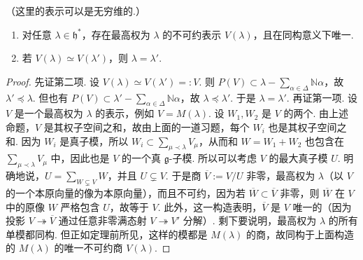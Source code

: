 \begin{theorem}\label{thm:ssl-4-1-6}
（这里的表示可以是无穷维的.）
\begin{enumerate}[label=\roman*)]
\item\label{ssl-4-1-6-i} 对任意 $\lambda\in\mathfrak h^*$，存在最高权为 $\lambda$ 的不可约表示 $V(\lambda)$，且在同构意义下唯一.
\item\label{ssl-4-1-6-ii} 若 $V(\lambda)\simeq V(\lambda')$，则 $\lambda=\lambda'$.
\end{enumerate}
\end{theorem}
\begin{proof}
先证第二项. 设 $V(\lambda)\simeq V(\lambda')=:V$. 则 $P(V)\subset\lambda-\sum_{\alpha\in\Delta}\mathbb N\alpha$，故 $\lambda'\preccurlyeq\lambda$. 但也有 $P(V)\subset\lambda'-\sum_{\alpha\in\Delta}\mathbb N\alpha$，故 $\lambda\preccurlyeq\lambda'$. 于是 $\lambda=\lambda'$.
再证第一项. 设 $V$ 是一个最高权为 $\lambda$ 的表示，例如 $V=M(\lambda)$. 设 $W_1,W_2$ 是 $V$ 的两个. 由上述命题，$V$ 是其权子空间之和，故由上面的一道习题，每个 $W_i$ 也是其权子空间之和. 因为 $W_i$ 是真子模，所以 $W_i\subset\sum_{\mu\prec\lambda}V_\mu$，从而和 $W=W_1+W_2$ 也包含在 $\sum_{\mu\prec\lambda}V_\mu$ 中，因此也是 $V$ 的一个真 $\mathfrak g$-子模. 所以可以考虑 $V$ 的最大真子模 $U$. 明确地说，$U=\sum_{W\subsetneq V}W$，并且 $U\subsetneq V$. 于是商 $\overline V:=V/U$ 非零，最高权为 $\lambda$（以 $V$ 的一个本原向量的像为本原向量），而且不可约，因为若 $\overline W\subset\overline V$ 非零，则 $\overline W$ 在 $V$ 中的原像 $W$ 严格包含 $U$，故等于 $V$. 此外，这一构造表明，$\overline V$ 是 $V$ 唯一的（因为投影 $V\twoheadrightarrow\overline V$ 通过任意非零满态射 $V\twoheadrightarrow V'$ 分解）.
剩下要说明，最高权为 $\lambda$ 的所有单模都同构. 但正如定理前所见，这样的模都是 $M(\lambda)$ 的商，故同构于上面构造的 $M(\lambda)$ 的唯一不可约商 $V(\lambda)$.
\end{proof}
